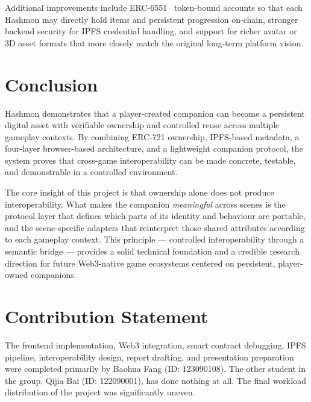 \documentclass[sigconf]{acmart}
\begin{document}
Additional improvements include ERC-6551~\cite{erc6551} token-bound accounts so that each Hashmon may directly hold items and persistent progression on-chain, stronger backend security for IPFS credential handling, and support for richer avatar or 3D asset formats that more closely match the original long-term platform vision.

\section{Conclusion}
Hashmon demonstrates that a player-created companion can become a persistent digital asset with verifiable ownership and controlled reuse across multiple gameplay contexts. By combining ERC-721 ownership, IPFS-based metadata, a four-layer browser-based architecture, and a lightweight companion protocol, the system proves that cross-game interoperability can be made concrete, testable, and demonstrable in a controlled environment.

The core insight of this project is that ownership alone does not produce interoperability. What makes the companion \emph{meaningful} across scenes is the protocol layer that defines which parts of its identity and behaviour are portable, and the scene-specific adapters that reinterpret those shared attributes according to each gameplay context. This principle --- controlled interoperability through a semantic bridge --- provides a solid technical foundation and a credible research direction for future Web3-native game ecosystems centered on persistent, player-owned companions.

\section*{Contribution Statement}
The frontend implementation, Web3 integration, smart contract debugging, IPFS pipeline, interoperability design, report drafting, and presentation preparation were completed primarily by Baohua Fang (ID: 123090108). The other student in the group, Qijia Bai (ID: 122090001), has done nothing at all. The final workload distribution of the project was significantly uneven.



\end{document}
